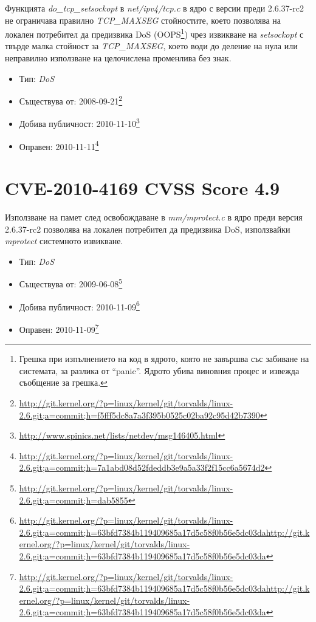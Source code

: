 \documentclass[a4paper,12pt,leqno]{article}
\begin{document}
Функцията \textit{do\_tcp\_setsockopt} в \textit{net/ipv4/tcp.c} в ядро с версии преди 2.6.37-rc2
не ограничава правилно \textit{TCP\_MAXSEG} стойностите, което позволява на локален потребител да
предизвика DoS (OOPS\footnote{Грешка при изпълнението на код в ядрото, която не завършва със забиване на системата, за разлика от ``panic''. Ядрото
убива виновния процес и извежда съобщение за грешка.})
чрез извикване на \textit{setsockopt} с твърде малка стойност за \textit{TCP\_MAXSEG}, което води до деление на
нула или неправилно използване на целочислена променлива без знак.
\begin{itemize}
    \item Тип: \textit{DoS}
    \item Съществува от: 2008-09-21\footnote{\url{http://git.kernel.org/?p=linux/kernel/git/torvalds/linux-2.6.git;a=commit;h=f5fff5dc8a7a3f395b0525c02ba92c95d42b7390}}
    \item Добива публичност: 2010-11-10\footnote{\url{http://www.spinics.net/lists/netdev/msg146405.html}}
    \item Оправен: 2010-11-11\footnote{\url{http://git.kernel.org/?p=linux/kernel/git/torvalds/linux-2.6.git;a=commit;h=7a1abd08d52fdeddb3e9a5a33f2f15cc6a5674d2}}
\end{itemize}



\section{ CVE-2010-4169 CVSS Score 4.9} %
\label{sec: CVE-2010-4169 CVSS Score 4.9}

Използване на памет след освобождаване в \textit{mm/mprotect.c} в ядро преди версия 2.6.37-rc2 позволява
на локален потребител да предизвика DoS, използвайки \textit{mprotect} системното извикване.
\begin{itemize}
    \item Тип: \textit{DoS}
    \item Съществува от: 2009-06-08\footnote{\url{http://git.kernel.org/?p=linux/kernel/git/torvalds/linux-2.6.git;a=commit;h=dab5855}}
    \item Добива публичност: 2010-11-09\footnote{\url{http://git.kernel.org/?p=linux/kernel/git/torvalds/linux-2.6.git;a=commit;h=63bfd7384b119409685a17d5c58f0b56e5dc03dahttp://git.kernel.org/?p=linux/kernel/git/torvalds/linux-2.6.git;a=commit;h=63bfd7384b119409685a17d5c58f0b56e5dc03da}}
    \item Оправен:  2010-11-09\footnote{\url{http://git.kernel.org/?p=linux/kernel/git/torvalds/linux-2.6.git;a=commit;h=63bfd7384b119409685a17d5c58f0b56e5dc03dahttp://git.kernel.org/?p=linux/kernel/git/torvalds/linux-2.6.git;a=commit;h=63bfd7384b119409685a17d5c58f0b56e5dc03da}}
\end{itemize}
\end{document}

